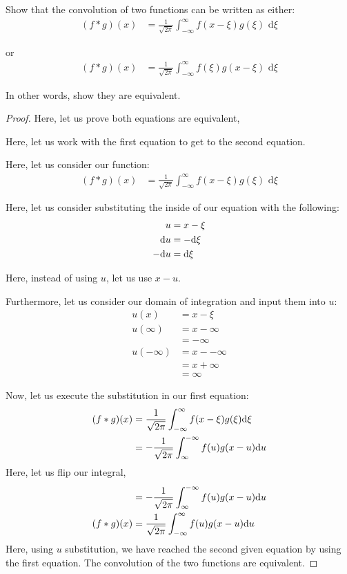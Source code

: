 \item Show that the convolution of two functions can be written as either:
%
\begin{align*}
  (f * g) (x) & = \frac{1}{\sqrt{2 \pi}} \int^\infty_{-\infty} f(x - \xi) g(\xi) \text{ d}\xi
\end{align*}

or
%
\begin{align*}
  (f * g) (x) & = \frac{1}{\sqrt{2 \pi}} \int^\infty_{-\infty} f(\xi) g(x - \xi) \text{ d}\xi
\end{align*}

In other words, show they are equivalent.


\begin{proof}
  Here, let us prove both equations are equivalent,

Here, let us work with the first equation to get to the second equation.

Here, let us consider our function:
%
\begin{align}
  (f * g)(x) & = \frac{1}{\sqrt{2 \pi}} \int^\infty_{-\infty} f(x - \xi) g(\xi) \text{ d}\xi
\end{align}

Here, let us consider substituting the inside of our equation with the following:
%
\begin{align}
  u & = x - \xi\\
  \text du & = - \text d\xi\\
  - \text du & = \text d\xi
\end{align}

Here, instead of using $u$, let us use $x - u$.

Furthermore, let us consider our domain of integration and input them into $u$:
%
\begin{align}
  u(x) & = x - \xi\\
  u(\infty) & = x - \infty\\
  & = -\infty\\
  u(-\infty) & = x - - \infty\\
  & = x + \infty\\
  & = \infty
\end{align}

Now, let us execute the substitution in our first equation:
%
\begin{align}
  (f * g)(x)
  & =
  \frac{1}{\sqrt{2 \pi}}
  \int^\infty_{-\infty}
  f(x - \xi) g(\xi) \text d \xi\\
  & =
  -\frac{1}{\sqrt{2 \pi}}
  \int^{-\infty}_\infty
  f(u) g(x - u) \text du
\end{align}
Here, let us flip our integral,
%
\begin{align}
  & =
  -\frac{1}{\sqrt{2 \pi}}
  \int^{-\infty}_\infty
  f(u) g(x - u) \text du\\
  (f * g)(x) & =
  \frac{1}{\sqrt{2 \pi}}
  \int^{\infty}_{-\infty}
  f(u) g(x - u) \text du
\end{align}
Here, using $u$ substitution, we have reached the second given equation by using the first equation. The convolution of the two functions are equivalent.
\end{proof}

